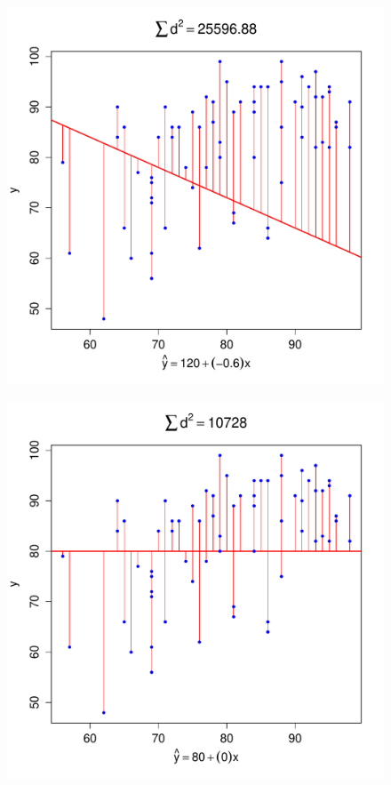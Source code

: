 \documentclass[handout]{beamer}
\begin{document}
\begin{frame}
\begin{figure}
	\includegraphics[scale = 0.48]{./images/SS1}
\end{figure}
\end{frame}
\begin{frame}
\begin{figure}
	\includegraphics[scale = 0.48]{./images/SS2}
\end{figure}
\end{frame}
\end{document}
